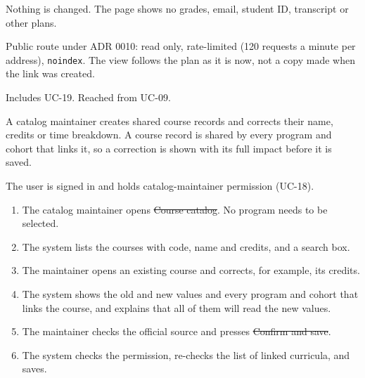 Nothing is changed. The page shows no grades, email, student ID, transcript or other plans.

Public route under ADR 0010: read only, rate-limited (120 requests a minute per address), \texttt{noindex}. The view
follows the plan as it is now, not a copy made when the link was created.

Includes UC-19. Reached from UC-09.


A catalog maintainer creates shared course records and corrects their name, credits or time breakdown. A course record is
shared by every program and cohort that links it, so a correction is shown with its full impact before it is saved.

The user is signed in and holds catalog-maintainer permission (UC-18).

\begin{enumerate}
  \item The catalog maintainer opens \st{Course catalog}. No program needs to be selected.
  \item The system lists the courses with code, name and credits, and a search box.
  \item The maintainer opens an existing course and corrects, for example, its credits.
  \item The system shows the old and new values and every program and cohort that links the course, and explains that all
        of them will read the new values.
  \item The maintainer checks the official source and presses \st{Confirm and save}.
  \item The system checks the permission, re-checks the list of linked curricula, and saves.
\end{enumerate}

